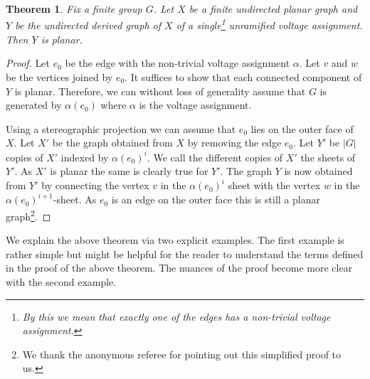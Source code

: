 \documentclass{amsart}
\newtheorem{theorem}{Theorem}[section]
\numberwithin{equation}{section}
\theoremstyle{remark}
\theoremstyle{plain} %
\begin{document}
\begin{theorem}
\label{thm:planar}
Fix a finite group $G$.
Let $X$ be a finite undirected planar graph and $Y$ be the undirected derived graph of $X$ of a single\footnote{By this we mean that exactly one of the edges has a non-trivial voltage assignment.} \emph{unramified} voltage assignment.
Then $Y$ is planar.
\end{theorem}

\begin{proof}
Let $e_0$ be the edge with the non-trivial voltage assignment $\alpha$.
Let $v$ and $w$ be the vertices joined by $e_0$.
It suffices to show that each connected component of $Y$ is planar.
Therefore, we can without loss of generality assume that $G$ is generated by $\alpha(e_0)$ where $\alpha$ is the voltage assignment.

{Using a stereographic projection we can assume that $e_0$ lies on the outer face of $X$.
Let $X'$ be the graph obtained from $X$ by removing the edge $e_0$.
Let $Y'$ be $\vert G\vert$ copies of $X'$ indexed by $\alpha(e_0)^i$. We call the different copies of $X'$ the sheets of $Y'$. As $X'$ is planar the same is clearly true for $Y'$. The graph $Y$ is now obtained from $Y'$ by connecting the vertex $v$ in the $\alpha(e_0)^i$ sheet with the vertex $w$ in the $\alpha(e_0)^{i+1}$-sheet. As $e_0$ is an edge on the outer face this is still a planar graph}\footnote{{We thank the anonymous referee for pointing out this simplified proof to us.}}.
\end{proof}

We explain the above theorem via two explicit examples.
The first example is rather simple but might be helpful for the reader to understand the terms defined in the proof of the above theorem.
The nuances of the proof become more clear with the second example.
\end{document}
